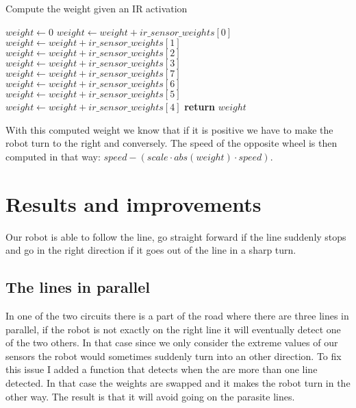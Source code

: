 \FloatBarrier
\begin{algorithm}
    \caption{Compute the weight given an IR activation}
    \label{compute_ir_weight}
    \begin{algorithmic}[1]
            \State $weight \gets 0$
                \State $weight \gets weight + ir\_sensor\_weights[0]$
                \State $weight \gets weight + ir\_sensor\_weights[1]$
                \State $weight \gets weight + ir\_sensor\_weights[2]$
                \State $weight \gets weight + ir\_sensor\_weights[3]$
            \EndIf
                \State $weight \gets weight + ir\_sensor\_weights[7]$
                \State $weight \gets weight + ir\_sensor\_weights[6]$
                \State $weight \gets weight + ir\_sensor\_weights[5]$
                \State $weight \gets weight + ir\_sensor\_weights[4]$
            \EndIf
            \State \textbf{return} $weight$
        \EndProcedure
    \end{algorithmic}
\end{algorithm}
\FloatBarrier

With this computed weight we know that if it is positive we have to make the robot turn to the right and conversely.
The speed of the opposite wheel is then computed in that way: $speed - (scale \cdot abs(weight) \cdot speed)$.

\section*{Results and improvements}

Our robot is able to follow the line, go straight forward if the line suddenly stops and go in the right direction if it goes out of the line in a sharp turn.

\subsection*{The lines in parallel}

In one of the two circuits there is a part of the road where there are three lines in parallel, if the robot is not exactly on the right line it will eventually detect one of the two others.
In that case since we only consider the extreme values of our sensors the robot would sometimes suddenly turn into an other direction.
To fix this issue I added a function that detects when the are more than one line detected.
In that case the weights are swapped and it makes the robot turn in the other way.
The result is that it will avoid going on the parasite lines.

